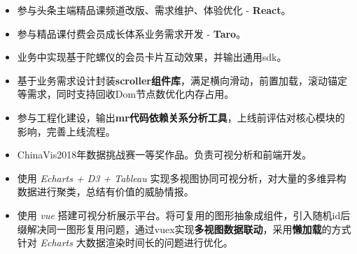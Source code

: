 \documentclass[10pt,a4paper]{altacv}
\begin{document}
\begin{CJK}{UTF8}{gkai}



\begin{fullwidth}
\makecvheader
\end{fullwidth}
\end{CJK}


\begin{CJK}{UTF8}{gbsn}
\begin{CJK}{UTF8}{gkai}
\end{CJK}

\begin{itemize}
\item 参与头条主端精品课频道改版、需求维护、体验优化 - \textbf{React}。
\item 参与精品课付费会员成长体系业务需求开发 - \textbf{Taro}。
\item 业务中实现基于陀螺仪的会员卡片互动效果，并输出通用sdk。
\item 基于业务需求设计封装\textbf{scroller组件库}，满足横向滑动，前置加载，滚动锚定等需求，同时支持回收Dom节点数优化内存占用。
\item 参与工程化建设，输出\textbf{mr代码依赖关系分析工具}，上线前评估对核心模块的影响，完善上线流程。
\end{itemize}



\begin{CJK}{UTF8}{gkai}
\end{CJK}

\begin{itemize}
\item ChinaVis2018年数据挑战赛一等奖作品。负责可视分析和前端开发。
\item 使用 \textit{Echarts + D3 + Tableau} 实现多视图协同可视分析，对大量的多维异构数据进行聚类，总结有价值的威胁情报。
\item 使用 \textit{vue} 搭建可视分析展示平台。将可复用的图形抽象成组件，引入随机id后缀解决同一图形复用问题，通过vuex实现\textbf{多视图数据联动}，采用\textbf{懒加载}的方式针对 \textit{Echarts} 大数据渲染时间长的问题进行优化。
\end{itemize}


\end{CJK}
\end{document}
